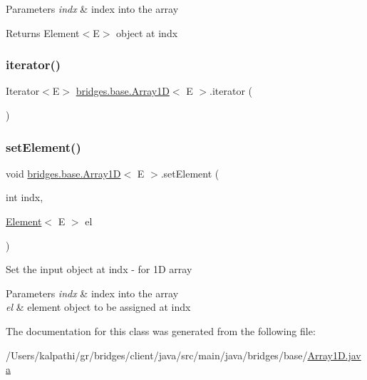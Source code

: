 \begin{DoxyParams}{Parameters}
{\em indx} & index into the array \\
\hline
\end{DoxyParams}
\begin{DoxyReturn}{Returns}
Element$<$\+E$>$ object at \textquotesingle{}indx\textquotesingle{} 
\end{DoxyReturn}
\mbox{\label{classbridges_1_1base_1_1_array1_d_aed723a9f55895c1673e73cb818be7c15}} 
\subsubsection{\texorpdfstring{iterator()}{iterator()}}
{\footnotesize\ttfamily Iterator$<$E$>$ \mbox{\hyperlink{classbridges_1_1base_1_1_array1_d}{bridges.\+base.\+Array1D}}$<$ E $>$.iterator (\begin{DoxyParamCaption}{ }\end{DoxyParamCaption})}

\mbox{\label{classbridges_1_1base_1_1_array1_d_ac749a6d97307998a2b37773456aca0fe}} 
\subsubsection{\texorpdfstring{set\+Element()}{setElement()}}
{\footnotesize\ttfamily void \mbox{\hyperlink{classbridges_1_1base_1_1_array1_d}{bridges.\+base.\+Array1D}}$<$ E $>$.set\+Element (\begin{DoxyParamCaption}\item[{int}]{indx,  }\item[{\mbox{\hyperlink{classbridges_1_1base_1_1_element}{Element}}$<$ E $>$}]{el }\end{DoxyParamCaption})}

Set the input object at \textquotesingle{}indx\textquotesingle{} -\/ for 1D array


\begin{DoxyParams}{Parameters}
{\em indx} & index into the array \\
\hline
{\em el} & element object to be assigned at \textquotesingle{}indx\textquotesingle{} \\
\hline
\end{DoxyParams}


The documentation for this class was generated from the following file\+:\begin{DoxyCompactItemize}
\item 
/\+Users/kalpathi/gr/bridges/client/java/src/main/java/bridges/base/\mbox{\hyperlink{_array1_d_8java}{Array1\+D.\+java}}\end{DoxyCompactItemize}
